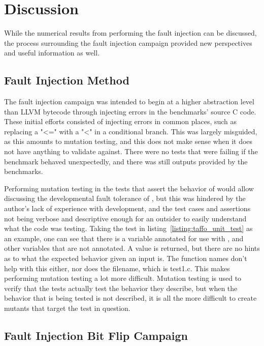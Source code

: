 \section{Discussion}

While the numerical results from performing the fault injection can be discussed, the process surrounding the fault injection campaign provided new perspectives and useful information as well. 

\subsection{Fault Injection Method}

The fault injection campaign was intended to begin at a higher abstraction level than LLVM bytecode through injecting errors in the benchmarks' source C code. These initial efforts consisted of injecting errors in common places, such as replacing a "<=" with a "<" in a conditional branch. This was largely misguided, as this amounts to mutation testing, and this does not make sense when it does not have anything to validate against. There were no tests that were failing if the benchmark behaved unexpectedly, and there was still outputs provided by the benchmarks. 

Performing mutation testing in the tests that assert the behavior of \taffo{} would allow discussing the developmental fault tolerance of \taffo{}, but this was hindered by the author's lack of experience with \taffo{} development, and the test cases and assertions not being verbose and descriptive enough for an outsider to easily understand what the code was testing. Taking the test in listing~\ref{listing:taffo_unit_test} as an example, one can see that there is a variable annotated for use with \taffo{},  and other variables that are not annotated. A value is returned, but there are no hints as to what the expected behavior given an input is. The function names don't help with this either, nor does the filename, which is test1.c. This makes performing mutation testing a lot more difficult. Mutation testing is used to verify that the tests actually test the behavior they describe, but when the behavior that is being tested is not described, it is all the more difficult to create mutants that target the test in question.

\subsection{Fault Injection Bit Flip Campaign}

